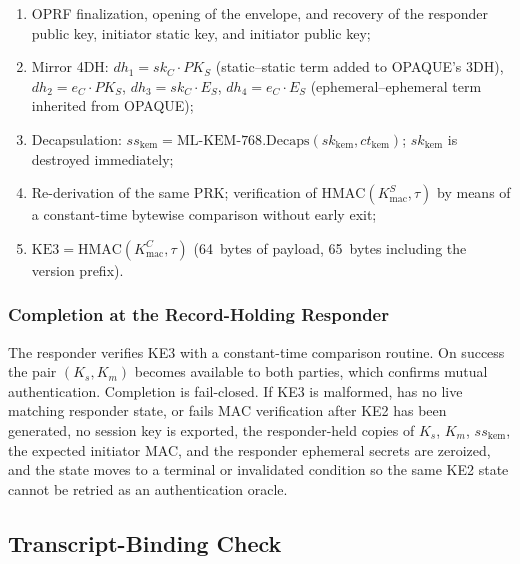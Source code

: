 \documentclass[preprint,12pt]{elsarticle}
\theoremstyle{remark}
\begin{document}
\begin{enumerate}
  \item OPRF finalization, opening of the envelope, and recovery of the
        responder public key, initiator static key, and initiator public
        key;
  \item Mirror 4DH:
        $dh_1 = sk_C \cdot PK_S$ (static--static term added to OPAQUE's 3DH),
        $dh_2 = e_C \cdot PK_S$, $dh_3 = sk_C \cdot E_S$,
        $dh_4 = e_C \cdot E_S$ (ephemeral--ephemeral term inherited from
        OPAQUE);
  \item Decapsulation:
        $ss_{\mathrm{kem}} =
        \mathrm{ML\text{-}KEM\text{-}768.Decaps}(sk_{\mathrm{kem}},
        ct_{\mathrm{kem}})$; $sk_{\mathrm{kem}}$ is destroyed
        immediately;
  \item Re-derivation of the same PRK; verification of
        $\mathrm{HMAC}(K_{\mathrm{mac}}^S, \tau)$ by means of a
        constant-time bytewise comparison without early exit;
  \item $\mathrm{KE3} = \mathrm{HMAC}(K_{\mathrm{mac}}^C, \tau)$
        (64~bytes of payload, 65~bytes including the version prefix).
\end{enumerate}

\subsubsection{Completion at the Record-Holding Responder}

The responder verifies KE3 with a constant-time comparison routine. On success the pair $(K_s, K_m)$ becomes available to both parties, which confirms mutual authentication. Completion is fail-closed. If KE3 is malformed, has no live matching responder state, or fails MAC verification after KE2 has been generated, no session key is exported, the responder-held copies of $K_s$, $K_m$, $ss_{\mathrm{kem}}$, the expected initiator MAC, and the responder ephemeral secrets are zeroized, and the state moves to a terminal or invalidated condition so the same KE2 state cannot be retried as an authentication oracle.

\subsection{Transcript-Binding Check}
\end{document}
